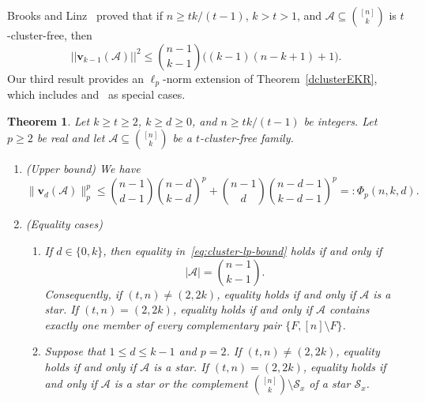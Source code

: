 \documentclass[10pt,a4paper]{amsart}
\numberwithin{equation}{section}
\newtheorem{theorem}{Theorem}[section]
\def\A{\mathcal{A}}
\begin{document}
Brooks and Linz~\cite[Theorem 3.6]{Brooks} proved that if $n\geq tk/(t-1)$, $k>t>1$, and $\A\subseteq\binom{[n]}k$ is $t$-cluster-free, then
$$||\mathbf{v}_{k-1}(\A)||^2
\leq   \binom{n-1}{k-1}\big((k-1)(n-k+ 1)+1\big). $$
Our third result provides an $\ell_p$-norm extension of Theorem~\ref{dclusterEKR}, which includes \cite[Theorem 3.6]{Brooks} and~\cite[Theorem 1.5]{Cao} as special cases.






\begin{theorem}%
\label{clusterEKRlp}
Let $k \geq t\geq 2$, $k\geq d\geq 0$, and $n\geq tk/(t-1)$ be integers.
Let $p\geq2$ be real and let
$\A\subseteq\binom{[n]}k$ be a $t$-cluster-free family.
\begin{enumerate}[label={\rm (\alph*)}]

\item {\rm(Upper bound)} We have
\begin{equation}\label{eq:cluster-lp-bound}
\|\mathbf{v}_d(\A)\|_p^p
\leq \binom{n-1}{d-1}\binom{n-d}{k-d}^{\!p}
+\binom{n-1}{d}\binom{n-d-1}{k-d-1}^{\!p}=: \Phi_p(n,k,d).
\end{equation}

\item {\rm(Equality cases)}
\begin{enumerate}[label={\rm (\roman*)}]
\item If $d\in\{0,k\}$, then equality in~\eqref{eq:cluster-lp-bound}
holds if and only if
\[
|\A|=\binom{n-1}{k-1}.
\]
Consequently, if $(t,n)\neq(2,2k)$, equality holds if and only if
$\A$ is a star.  If $(t,n)=(2,2k)$, equality holds if and only if
$\A$ contains exactly one member of every complementary pair
$\{F,[n]\setminus F\}$.

\item Suppose that $1\leq d\leq k-1$ and $p=2$.  If
$(t,n)\neq(2,2k)$, equality holds if and only if $\A$ is a star.
If $(t,n)=(2,2k)$, equality holds if and only if $\A$ is a star
or the complement $\binom{[n]}k\setminus\mathcal S_x$ of a star
$\mathcal S_x$.


\end{enumerate}
\end{enumerate}
\end{theorem}
\end{document}
